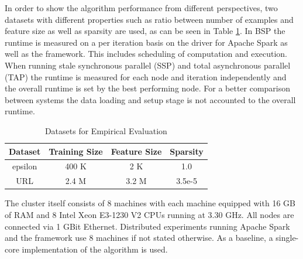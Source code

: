 In order to show the algorithm performance from different perspectives, two datasets with different properties such as ratio between number of examples and feature size as well as sparsity are used, as can be seen in Table \ref{tab:datasets}.
In BSP the runtime is measured on a per iteration basis on the driver for Apache Spark as well as the framework.
This includes scheduling of computation and execution.
When running stale synchronous parallel (SSP) and total asynchronous parallel (TAP) the runtime is measured for each node and iteration independently and the overall runtime is set by the best performing node.
For a better comparison between systems the data loading and setup stage is not accounted to the overall runtime.
\begin{table}[h]
\begin{center}
\begin{tabular}{ | c | c | c | c |}
\hline
\textbf{Dataset} & \textbf{Training Size} & \textbf{Feature Size} & \textbf{Sparsity} \\ \hline
epsilon & 400 K & 2 K & 1.0 \\ \hline
URL & 2.4 M & 3.2 M & 3.5e-5 \\
\hline
\end{tabular}
\end{center}
\caption{Datasets for Empirical Evaluation}
\label{tab:datasets}
\end{table}

The cluster itself consists of 8 machines with each machine equipped with 16 GB of RAM and 8 Intel Xeon E3-1230 V2 CPUs running at 3.30 GHz.
All nodes are connected via 1 GBit Ethernet.
Distributed experiments running Apache Spark and the framework use 8 machines if not stated otherwise.
As a baseline, a single-core implementation of the algorithm is used.

